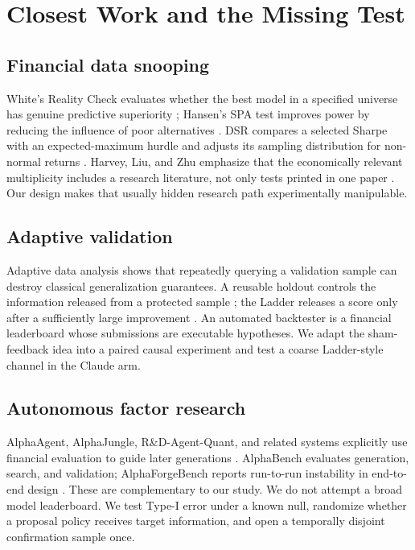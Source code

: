 \documentclass[sigconf,nonacm]{acmart}
\begin{document}
\section{Closest Work and the Missing Test}

\subsection{Financial data snooping}

White's Reality Check evaluates whether the best model in a specified universe
has genuine predictive superiority \cite{white2000reality}; Hansen's SPA test
improves power by reducing the influence of poor alternatives
\cite{hansen2005spa}. DSR compares a selected Sharpe with an expected-maximum
hurdle and adjusts its sampling distribution for non-normal returns
\cite{bailey2014dsr}. Harvey, Liu, and Zhu emphasize that the economically
relevant multiplicity includes a research literature, not only tests printed in
one paper \cite{harvey2016crosssection}. Our design makes that usually hidden
research path experimentally manipulable.

\subsection{Adaptive validation}

Adaptive data analysis shows that repeatedly querying a validation sample can
destroy classical generalization guarantees. A reusable holdout controls the
information released from a protected sample \cite{dwork2015holdout}; the
Ladder releases a score only after a sufficiently large improvement
\cite{blum2015ladder}. An automated backtester is a financial leaderboard whose
submissions are executable hypotheses. We adapt the sham-feedback idea into a
paired causal experiment and test a coarse Ladder-style channel in the Claude
arm.

\subsection{Autonomous factor research}

AlphaAgent, AlphaJungle, R\&D-Agent-Quant, and related systems explicitly use
financial evaluation to guide later generations \cite{tang2025alphaagent,
shi2026alphajungle,li2025rdagent}. AlphaBench evaluates
generation, search, and validation; AlphaForgeBench reports run-to-run
instability in end-to-end design \cite{luo2026alphabench,
zhang2026alphaforgebench}. These are complementary to our study. We do not
attempt a broad model leaderboard. We test Type-I error under a known null,
randomize whether a proposal policy receives target information, and open a
temporally disjoint confirmation sample once.
\end{document}
